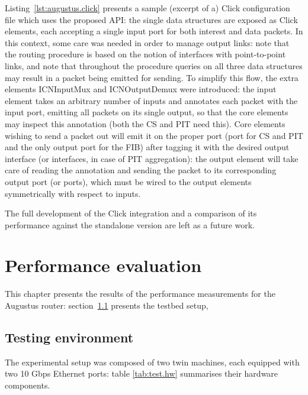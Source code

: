 \documentclass[11pt,a4paper,twoside,titlepage,openany]{book}
\newcommand{\mono}[1]{{\footnotesize \ttfamily #1}}
\begin{document}
Listing~\ref{lst:augustus.click} presents a sample (excerpt of a) Click configuration file which uses the proposed API: the single data structures are exposed as Click elements, each accepting a single input port for both interest and data packets. In this context, some care was needed in order to manage output links: note that the routing procedure is based on the notion of interfaces with point-to-point links, and note that throughout the procedure queries on all three data structures may result in a packet being emitted for sending. To simplify this flow, the extra elements \mono{ICNInputMux} and \mono{ICNOutputDemux} were introduced: the input element takes an arbitrary number of inputs and annotates each packet with the input port, emitting all packets on its single output, so that the core elements may inspect this annotation (both the CS and PIT need this). Core elements wishing to send a packet out will emit it on the proper port (port \mono{[1]} for CS and PIT and the only output port for the FIB) after tagging it with the desired output interface (or interfaces, in case of PIT aggregation): the output element will take care of reading the annotation and sending the packet to its corresponding output port (or ports), which must be wired to the output elements symmetrically with respect to inputs.

The full development of the Click integration and a comparison of its performance against the standalone version are left as a future work.



\chapter{Performance evaluation}
\label{chap:test}

This chapter presents the results of the performance measurements for the Augustus router: section~\ref{sec:test.env} presents the testbed setup, 

\section{Testing environment}\label{sec:test.env}
The experimental setup was composed of two twin machines, each equipped with two 10 Gbps Ethernet ports:
table \ref{tab:test.hw} summarises their hardware components.
\end{document}
